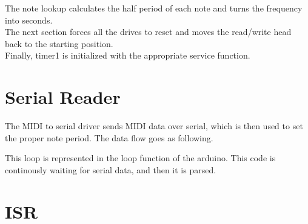 \documentclass[11pt, a4paper]{report}
\begin{document}


The note lookup calculates the half period of each note and turns the frequency into seconds. \\



The next section forces all the drives to reset and moves the read/write head back to the starting position. \\



Finally, timer1 is initialized with the appropriate service function. 



\section{Serial Reader}

The MIDI to serial driver sends MIDI data over serial, which is then used to set the proper note period. The data flow goes as following. \\
\begin{center}
\end{center}

This loop is represented in the loop function of the arduino. This code is continously waiting for serial data, and then it is parsed. 




\section{ISR}
\end{document}
